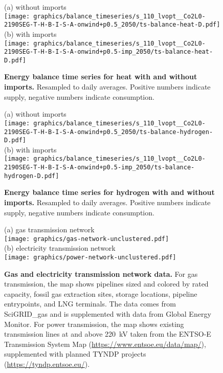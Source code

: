 \documentclass[5p,10pt]{elsarticle}
\begin{document}
\begin{figure*}
    \centering
    \footnotesize
    (a) without imports \\
    \texttt{[image: graphics/balance\_timeseries/s\_110\_lvopt\_\_Co2L0-2190SEG-T-H-B-I-S-A-onwind+p0.5\_2050/ts-balance-heat-D.pdf]} \\
    (b) with imports \\
    \texttt{[image: graphics/balance\_timeseries/s\_110\_lvopt\_\_Co2L0-2190SEG-T-H-B-I-S-A-onwind+p0.5-imp\_2050/ts-balance-heat-D.pdf]}
    \caption{\textbf{Energy balance time series for heat with and without imports.} Resampled to daily averages. Positive numbers indicate supply, negative numbers indicate consumption.}
    \label{fig:si:balance-heat}
\end{figure*}

\begin{figure*}
    \centering
    \footnotesize
    (a) without imports \\
    \texttt{[image: graphics/balance\_timeseries/s\_110\_lvopt\_\_Co2L0-2190SEG-T-H-B-I-S-A-onwind+p0.5\_2050/ts-balance-hydrogen-D.pdf]} \\
    (b) with imports \\
    \texttt{[image: graphics/balance\_timeseries/s\_110\_lvopt\_\_Co2L0-2190SEG-T-H-B-I-S-A-onwind+p0.5-imp\_2050/ts-balance-hydrogen-D.pdf]}
    \caption{\textbf{Energy balance time series for hydrogen with and without imports.} Resampled to daily averages. Positive numbers indicate supply, negative numbers indicate consumption.}
    \label{fig:si:balance-h2}
\end{figure*}

\begin{figure*}
    \centering
    \footnotesize
    (a) gas transmission network \\
    \texttt{[image: graphics/gas-network-unclustered.pdf]} \\
    (b) electricity transmission network \\
    \texttt{[image: graphics/power-network-unclustered.pdf]}
    \caption{\textbf{Gas and electricity transmission network data.} For gas
    transmission, the map shows pipelines sized and colored by rated capacity,
    fossil gas extraction sites, storage locations, pipeline entrypoints, and
    LNG terminals. The data comes from SciGRID\_gas and is supplemented with
    data from Global Energy Monitor. For power transmission, the map shows
    existing transmission lines at and above 220~kV taken from the ENTSO-E
    Transmission System Map (\url{https://www.entsoe.eu/data/map/}),
    supplemented with planned TYNDP projects (\url{https://tyndp.entsoe.eu/}).}
    \label{fig:si:networks-raw}
\end{figure*}
\end{document}

